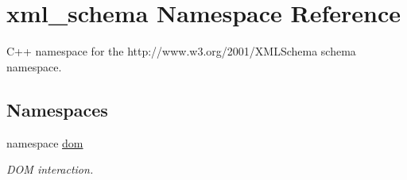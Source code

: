 \hypertarget{namespacexml__schema}{
\section{xml\_\-schema Namespace Reference}
\label{namespacexml__schema}
}


C++ namespace for the http://www.w3.org/2001/XMLSchema schema namespace.  


\subsection*{Namespaces}
\begin{DoxyCompactItemize}
\item 
namespace \hyperlink{namespacexml__schema_1_1dom}{dom}


\begin{DoxyCompactList}\small\item\em DOM interaction. \item\end{DoxyCompactList}

\end{DoxyCompactItemize}
